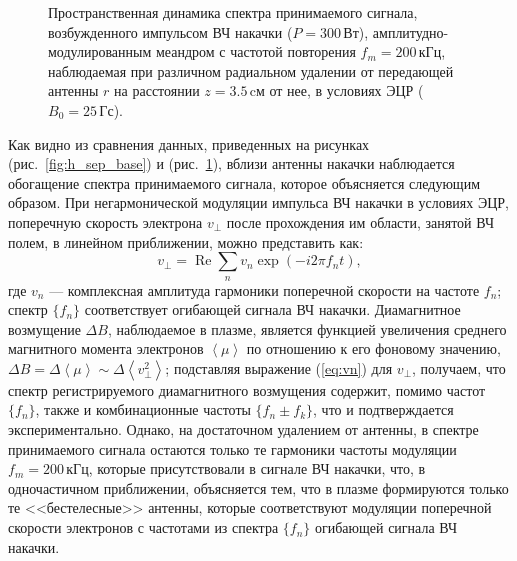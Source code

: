 \documentclass[10pt]{disser}
\renewcommand\Re{\operatorname{Re}}
\begin{document}
\begin{figure}
   \centering
   \def\svgwidth{0.7\columnwidth} %
   
   \vspace{1.0cm}
   \caption{Пространственная динамика спектра принимаемого сигнала, возбужденного импульсом ВЧ накачки ($P=300$\,Вт),  амплитудно-мо\-ду\-ли\-ро\-ван\-ным меандром с частотой повторения $f_m=200$\,кГц, наблюдаемая при различном радиальном удалении от передающей антенны $r$ на расстоянии $z=3.5$\,cм от нее, в условиях ЭЦР ($B_0 = 25$\,Гс).}
   \label{fig:h_sep}
\end{figure}

Как видно из сравнения данных, приведенных на рисунках (\mbox{рис.~\ref{fig:h_sep_base}}) и (\mbox{рис.~\ref{fig:h_sep}}), вблизи антенны накачки наблюдается обогащение спектра принимаемого сигнала, которое объясняется следующим образом. При негармонической модуляции импульса ВЧ накачки в условиях ЭЦР, поперечную скорость электрона $v_\perp$ после прохождения им области, занятой ВЧ полем, в линейном приближении, можно представить как: 
\begin{equation}
v_\perp=\Re{}{\sum_{n} v_n\exp(-i2\pi{}f_nt)},
\label{eq:vn}
\end{equation} 
где $v_n$ --- комплексная амплитуда гармоники поперечной скорости на частоте $f_n$; спектр $\{f_n\}$ соответствует огибающей сигнала ВЧ накачки. Диамагнитное возмущение $\Delta{}B$, наблюдаемое в плазме, является функцией увеличения среднего магнитного момента электронов $\left<\mu\right>$ по отношению к его фоновому значению, $\Delta{}B=\Delta\left<\mu\right>\sim{}\Delta{}\left<v_\perp^2\right>$; подставляя выражение (\ref{eq:vn}) для $v_\perp$, получаем, что спектр регистрируемого диамагнитного возмущения содержит, помимо частот $\{f_n\}$, также и комбинационные частоты $\{f_n\pm{}f_k\}$, что и подтверждается экспериментально. Однако, на достаточном удалением от антенны, в спектре принимаемого сигнала остаются только те гармоники частоты модуляции $f_m=200$\,кГц, которые присутствовали в сигнале ВЧ накачки, что, в одночастичном приближении, объясняется тем, что в плазме формируются только те <<бестелесные>> антенны, которые соответствуют модуляции поперечной скорости электронов с частотами из спектра  $\{f_n\}$ огибающей сигнала ВЧ накачки.
\end{document}
